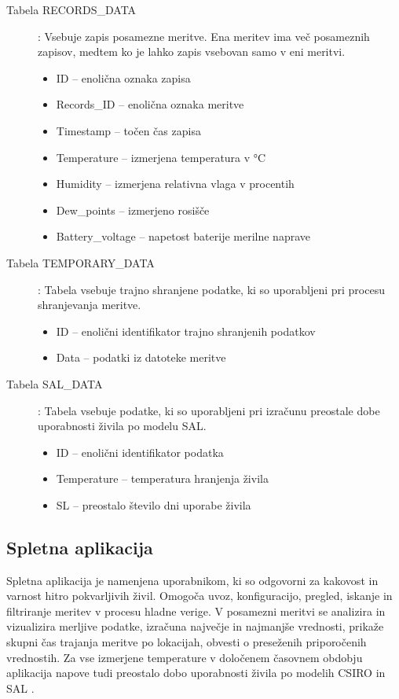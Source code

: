 \documentclass[a4paper, 12pt]{book}
\begin{document}
\begin{description}
\item[Tabela RECORDS\_DATA] : Vsebuje zapis posamezne meritve. Ena meritev ima več posameznih zapisov, medtem ko je lahko zapis vsebovan samo v eni meritvi.
	\begin{itemize}
		\item ID – enolična oznaka zapisa
		\item Records\_ID – enolična oznaka meritve
		\item Timestamp – točen čas zapisa
		\item Temperature – izmerjena temperatura v °C
		\item Humidity – izmerjena relativna vlaga v procentih
		\item Dew\_points – izmerjeno rosišče
		\item Battery\_voltage – napetost baterije merilne naprave
	\end{itemize}
	
\item[Tabela TEMPORARY\_DATA] : Tabela vsebuje trajno shranjene podatke, ki so uporabljeni pri procesu shranjevanja meritve.
	\begin{itemize}
		\item ID – enolični identifikator trajno shranjenih podatkov
		\item Data – podatki iz datoteke meritve
	\end{itemize}

\item[Tabela SAL\_DATA] : Tabela vsebuje podatke, ki so uporabljeni pri izračunu preostale dobe uporabnosti živila po modelu SAL.
	\begin{itemize}
		\item ID – enolični identifikator podatka
		\item Temperature – temperatura hranjenja živila
		\item SL – preostalo število dni uporabe živila
	\end{itemize}
\end{description}



\subsection{Spletna aplikacija}

Spletna aplikacija je namenjena uporabnikom, ki so odgovorni za kakovost in varnost hitro pokvarljivih živil. Omogoča uvoz, konfiguracijo, pregled, iskanje in filtriranje meritev v procesu hladne verige. V posamezni meritvi se analizira in vizualizira merljive podatke, izračuna največje in najmanjše vrednosti, prikaže skupni čas trajanja meritve po lokacijah, obvesti o preseženih priporočenih vrednostih. Za vse izmerjene temperature v določenem časovnem obdobju aplikacija napove tudi preostalo dobo uporabnosti živila po modelih CSIRO \cite{CSIRO-organizacija} in SAL \cite{magistrska-marolt}.
\end{document}
